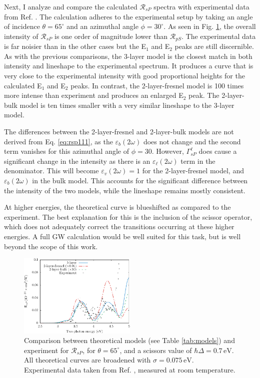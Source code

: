Next, I analyze and compare the calculated $\mathcal{R}_{sP}$ spectra with
experimental data from Ref. \cite{mejiaPRB02}. The calculation adheres to the
experimental setup by taking an angle of incidence $\theta=65^{\circ}$ and an
azimuthal angle $\phi=30^\circ$. As seen in Fig. \ref{fig:RsP}, the overall
intensity of $\mathcal{R}_{sP}$ is one order of magnitude lower than
$\mathcal{R}_{pS}$. The experimental data is far noisier than in the other cases
but the E$_{1}$ and E$_{2}$ peaks are still discernible. As with the previous
comparisons, the 3-layer model is the closest match in both intensity and
lineshape to the experimental spectrum. It produces a curve that is very close
to the experimental intensity with good proportional heights for the calculated
E$_{1}$ and E$_{2}$ peaks. In contrast, the 2-layer-fresnel model is 100 times
more intense than experiment and produces an enlarged E$_{2}$ peak. The
2-layer-bulk model is ten times smaller with a very similar lineshape to the
3-layer model.

The differences between the 2-layer-fresnel and 2-layer-bulk models are not
derived from Eq. \eqref{eq:rsp111}, as the $\varepsilon_{b}(2\omega)$ does not
change and the second term vanishes for this azimuthal angle of $\phi = 30$.
However, $\Gamma^{\ell}_{sP}$ does cause a significant change in the intensity
as there is an $\varepsilon_{\ell}(2\omega)$ term in the denominator. This will
become $\varepsilon_{v}(2\omega) = 1$ for the 2-layer-fresnel model, and
$\varepsilon_{b}(2\omega)$ in the bulk model. This accounts for the significant
difference between the intensity of the two models, while the lineshape remains
mostly consistent.

At higher energies, the theoretical curve is blueshifted as compared to the
experiment. The best explanation for this is the inclusion of the scissor
operator, which does not adequately correct the transitions occurring at these
higher energies. A full GW calculation would be well suited for this task, but
is well beyond the scope of this work.

\begin{figure}[H]
\centering
\includegraphics[width=0.5\textwidth]{content/figures/fig-Si1x1-Mejia_RsP}
\caption{Comparison between theoretical models (see Table \ref{tab:models}) and
experiment for $\mathcal{R}_{sP}$, for $\theta=65^{\circ}$, and a scissors
value of $\hbar\Delta = 0.7\,\text{eV}$. All theoretical curves are broadened
with $\sigma=0.075\,\text{eV}$. Experimental data taken from Ref.
\cite{mejiaPRB02}, measured at room temperature.}
\label{fig:RsP}
\end{figure}


